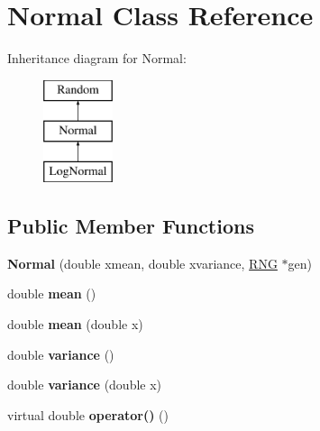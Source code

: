 \hypertarget{classNormal}{}\section{Normal Class Reference}
\label{classNormal}
Inheritance diagram for Normal\+:\begin{figure}[H]
\begin{center}
\leavevmode
\includegraphics[height=3.000000cm]{classNormal}
\end{center}
\end{figure}
\subsection*{Public Member Functions}
\begin{DoxyCompactItemize}
\item 
\mbox{\label{classNormal_afb809744e4cd1c713aae4b58908fd01d}} 
{\bfseries Normal} (double xmean, double xvariance, \hyperlink{classRNG}{R\+NG} $\ast$gen)
\item 
\mbox{\label{classNormal_aea85fa0b005d3cdda816bc447f1286ff}} 
double {\bfseries mean} ()
\item 
\mbox{\label{classNormal_a2b7bd472325dd774d61fd629db0db6df}} 
double {\bfseries mean} (double x)
\item 
\mbox{\label{classNormal_aa26ac3da8f897e9ab2142a6687d848ca}} 
double {\bfseries variance} ()
\item 
\mbox{\label{classNormal_a67427015715c1b76c1a18a82eb96425e}} 
double {\bfseries variance} (double x)
\item 
\mbox{\label{classNormal_af896319f6e3f10f15c4bab4ed7120d9d}} 
virtual double {\bfseries operator()} ()
\end{DoxyCompactItemize}
